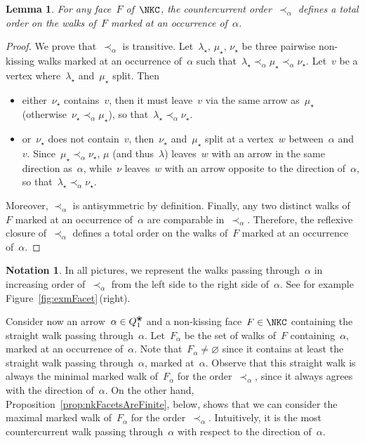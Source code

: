 \documentclass{amsart}
\newtheorem{lemma}[theorem]{Lemma}
\theoremstyle{definition}
\newtheorem{notation}[theorem]{Notation}
\newcommand{\fref}[1]{Figure~\ref{#1}} %
\newcommand{\blossom}{^\text{\ding{96}}} %
\begin{document}

\begin{lemma}
For any face~$F$ of~$\NKC$, the countercurrent order~$\prec_\alpha$ defines a total order on the walks of~$F$ marked at an occurrence of~$\alpha$.
\end{lemma}

\begin{proof}
We prove that~$\prec_\alpha$ is transitive.
Let~$\lambda_\star$, $\mu_\star$, $\nu_\star$ be three pairwise non-kissing walks marked at an occurrence of~$\alpha$ such that~${\lambda_\star \prec_\alpha \mu_\star \prec_\alpha \nu_\star}$. Let~$v$ be a vertex where~$\lambda_\star$ and~$\mu_\star$ split. Then
\begin{itemize}
\item either~$\nu_\star$ contains~$v$, then it must leave~$v$ via the same arrow as~$\mu_\star$ (otherwise~$\nu_\star \prec_\alpha \mu_\star$), so that~$\lambda_\star \prec_\alpha \nu_\star$.
\item or~$\nu_\star$ does not contain~$v$, then~$\nu_\star$ and~$\mu_\star$ split at a vertex~$w$ between~$\alpha$ and~$v$. Since~${\mu_\star \prec_\alpha \nu_\star}$, $\mu$ (and thus~$\lambda$) leaves~$w$ with an arrow in the same direction as~$\alpha$, while~$\nu$ leaves~$w$ with an arrow opposite to the direction of~$\alpha$, so that~$\lambda_\star \prec_\alpha \nu_\star$.
\end{itemize}
Moreover, $\prec_\alpha$ is antisymmetric by definition.
Finally, any two distinct walks of~$F$ marked at an occurrence of~$\alpha$ are comparable in~$\prec_\alpha$.
Therefore, the reflexive closure of~$\prec_\alpha$ defines a total order on the walks of~$F$ marked at an occurrence of~$\alpha$.
\end{proof}

\begin{notation}
In all pictures, we represent the walks passing through~$\alpha$ in increasing order of~$\prec_\alpha$ from the left side to the right side of~$\alpha$. See for example \fref{fig:exmFacet}\,(right).
\end{notation}

Consider now an arrow~$\alpha \in Q\blossom_1$ and a non-kissing face~$F \in \NKC$ containing the straight walk passing through~$\alpha$.
Let~$F_\alpha$ be the set of walks of~$F$ containing~$\alpha$, marked at an occurrence of~$\alpha$.
Note that~$F_\alpha \ne \varnothing$ since it contains at least the straight walk passing through~$\alpha$, marked at~$\alpha$.
Observe that this straight walk is always the minimal marked walk of~$F_\alpha$ for the order~$\prec_\alpha$, since it always agrees with the direction of~$\alpha$.
On the other hand, Proposition~\ref{prop:nkFacetsAreFinite}, below, shows that we can consider the maximal marked walk of~$F_\alpha$ for the order~$\prec_\alpha$.
Intuitively, it is the most countercurrent walk passing through~$\alpha$ with respect to the direction of~$\alpha$.
\end{document}
